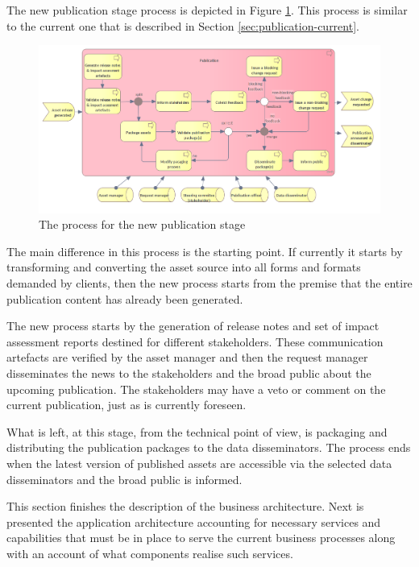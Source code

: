 	The new publication stage process is depicted in Figure \ref{fig:publication-new}. This process is similar to the current one that is described in Section \ref{sec:publication-current}.
	
	\begin{figure}[h]
		\centering
		\includegraphics[width=1.05\textwidth]{images/business/new/Publication.png}
		\caption{The process for the new publication stage}
		\label{fig:publication-new}
	\end{figure}

	The main difference in this process is the starting point. If currently it starts by transforming and converting the asset source into all forms and formats demanded by clients, then the new process starts from the premise that the entire publication content has already been generated. 
	
	The new process starts by the generation of release notes and set of impact assessment reports destined for different stakeholders. These communication artefacts are verified by the asset manager and then the request manager disseminates the news to the stakeholders and the broad public about the upcoming publication. The stakeholders may have a veto or comment on the current publication, just as is currently foreseen.   
	
	What is left, at this stage, from the technical point of view, is packaging and distributing the publication packages to the data disseminators. The process ends when the latest version of published assets are accessible via the selected data disseminators and the broad public is informed. 
	
	\enlargethispage{3em}
	
	This section finishes the description of the business architecture. Next is presented the application architecture accounting for necessary services and capabilities that must be in place to serve the current business processes along with an account of what components realise such services. 
	
	
	